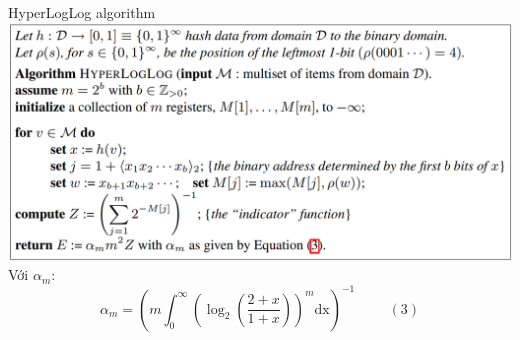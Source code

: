 \documentclass[10pt]{beamer}
\begin{document}
  
\begin{frame}{HyperLogLog algorithm}
  \includegraphics[scale=.5]{raw_hll.png}
  \indent Với $\alpha_m$:
  \[
      \alpha_m = \left(m\int_0^\infty\left(\log_2\left(\frac{2+x}{1+x}\right)\right)^m\text{dx}\right)^{-1} \hspace{1cm}(3)  
  \]
\end{frame}
\end{document}
